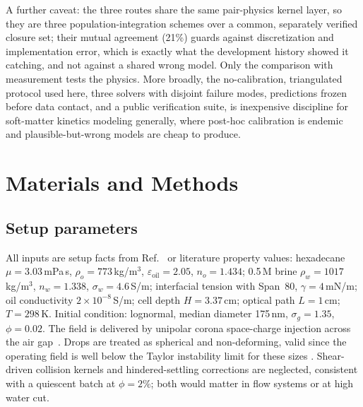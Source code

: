 \documentclass[aps,prfluids,reprint,amsmath,amssymb,superscriptaddress,longbibliography]{revtex4-2}
\begin{document}
A further caveat: the three routes share the same pair-physics kernel
layer, so they are three population-integration schemes over a common,
separately verified closure set; their mutual agreement (21\%) guards
against discretization and implementation error, which is exactly what the
development history showed it catching, and not against a shared wrong
model. Only the comparison with measurement tests the physics. More broadly, the no-calibration, triangulated protocol used here, three solvers
with disjoint failure modes, predictions frozen before data contact, and a
public verification suite, is inexpensive discipline for soft-matter
kinetics modeling generally, where post-hoc calibration is endemic and
plausible-but-wrong models are cheap to produce.

\section{Materials and Methods}

\subsection{Setup parameters}
All inputs are setup facts from Ref.~\cite{panat2025} or literature property
values: hexadecane $\mu=3.03$\,mPa\,s, $\rho_o=773$\,kg/m$^3$,
$\varepsilon_{\mathrm{oil}}=2.05$, $n_o=1.434$; 0.5\,M brine
$\rho_w=1017$\,kg/m$^3$, $n_w=1.338$, $\sigma_w=4.6$\,S/m; interfacial
tension with Span~80, $\gamma=4$\,mN/m; oil conductivity
$2\times10^{-8}$\,S/m; cell depth $H=3.37$\,cm; optical path $L=1$\,cm;
$T=298$\,K. Initial condition: lognormal, median diameter 175\,nm,
$\sigma_g=1.35$, $\phi=0.02$. The field is delivered by unipolar corona
space-charge injection across the air gap~\cite{sigmond1982,panat2025}.
Drops are treated as spherical and non-deforming, valid since the operating
field is well below the Taylor instability limit for these sizes
\cite{taylor1964,allanmason1962,berg2010}. Shear-driven collision kernels
\cite{saffmanturner1956} and hindered-settling corrections
\cite{richardsonzaki1954} are neglected, consistent with a quiescent batch
at $\phi=2\%$; both would matter in flow systems or at high water cut.
\end{document}
